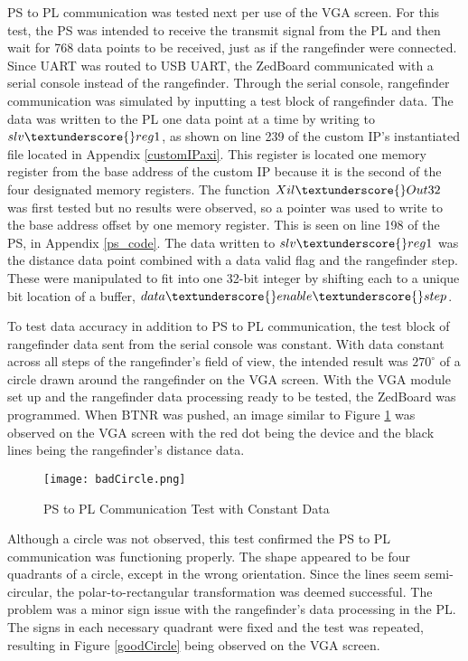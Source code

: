 PS to PL communication was tested next per use of the VGA screen. For this test, the PS was intended to receive the transmit signal from the PL and then wait for 768 data points to be received, just as if the rangefinder were connected. Since UART was routed to USB UART, the ZedBoard communicated with a serial console instead of the rangefinder. Through the serial console, rangefinder communication was simulated by inputting a test block of rangefinder data. The data was written to the PL one data point at a time by writing to $slv\textunderscore{}reg1$, as shown on line 239 of the custom IP's instantiated file located in Appendix \ref{customIPaxi}. This register is located one memory register from the base address of the custom IP because it is the second of the four designated memory registers. The function $Xil\textunderscore{}Out32$ was first tested but no results were observed, so a pointer was used to write to the base address offset by one memory register. This is seen on line 198 of the PS, in Appendix \ref{ps_code}. The data written to $slv\textunderscore{}reg1$ was the distance data point combined with a data valid flag and the rangefinder step. These were manipulated to fit into one 32-bit integer by shifting each to a unique bit location of a buffer, $data\textunderscore{}enable\textunderscore{}step$.
\par
To test data accuracy in addition to PS to PL communication, the test block of rangefinder data sent from the serial console was constant. With data constant across all steps of the rangefinder's field of view, the intended result was $270^\circ$ of a circle drawn around the rangefinder on the VGA screen. With the VGA module set up and the rangefinder data processing ready to be tested, the ZedBoard was programmed. When BTNR was pushed, an image similar to Figure \ref{badCircle} was observed on the VGA screen with the red dot being the device and the black lines being the rangefinder's distance data.

\begin{figure}[H]
	\centerline{\texttt{[image: badCircle.png]}}
	\caption{PS to PL Communication Test with Constant Data}
	\label{badCircle}
\end{figure}

Although a circle was not observed, this test confirmed the PS to PL communication was functioning properly. The shape appeared to be four quadrants of a circle, except in the wrong orientation. Since the lines seem semi-circular, the polar-to-rectangular transformation was deemed successful. The problem was a minor sign issue with the rangefinder's data processing in the PL. The signs in each necessary quadrant were fixed and the test was repeated, resulting in Figure \ref{goodCircle} being observed on the VGA screen.

